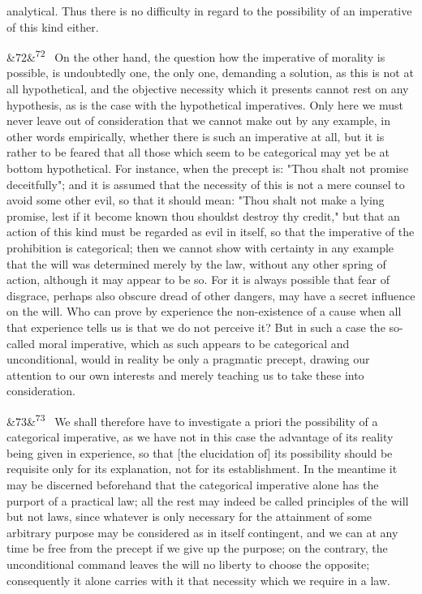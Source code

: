 \documentclass[12pt]{article}
\newcommand{\para}[1][]{\par\noindent\ifx&#1&\else\textsuperscript{\footnotesize #1}~\fi}
\begin{document}
analytical. Thus there is no difficulty in regard to the possibility of an imperative of this kind either.

\para[72] On the other hand, the question how the imperative of morality is possible, is undoubtedly one, the only one, demanding a solution, as this is not at all hypothetical, and the objective necessity which it presents cannot rest on any hypothesis, as is the case with the hypothetical imperatives. Only here we must never leave out of consideration that we cannot make out by any example, in other words empirically, whether there is such an imperative at all, but it is rather to be feared that all those which seem to be categorical may yet be at bottom hypothetical. For instance, when the precept is: "Thou shalt not promise deceitfully"; and it is assumed that the necessity of this is not a mere counsel to avoid some other evil, so that it should mean: "Thou shalt not make a lying promise, lest if it become known thou shouldst destroy thy credit," but that an action of this kind must be regarded as evil in itself, so that the imperative of the prohibition is categorical; then we cannot show with certainty in any example that the will was determined merely by the law, without any other spring of action, although it may appear to be so. For it is always possible that fear of disgrace, perhaps also obscure dread of other dangers, may have a secret influence on the will. Who can prove by experience the non-existence of a cause when all that experience tells us is that we do not perceive it? But in such a case the so-called moral imperative, which as such appears to be categorical and unconditional, would in reality be only a pragmatic precept, drawing our attention to our own interests and merely teaching us to take these into consideration.

\para[73] We shall therefore have to investigate a priori the possibility of a categorical imperative, as we have not in this case the advantage of its reality being given in experience, so that [the elucidation of] its possibility should be requisite only for its explanation, not for its establishment. In the meantime it may be discerned beforehand that the categorical imperative alone has the purport of a practical law; all the rest may indeed be called principles of the will but not laws, since whatever is only necessary for the attainment of some arbitrary purpose may be considered as in itself contingent, and we can at any time be free from the precept if we give up the purpose; on the contrary, the unconditional command leaves the will no liberty to choose the opposite; consequently it alone carries with it that necessity which we require in a law.
\end{document}
